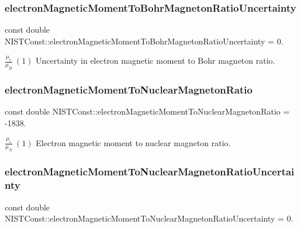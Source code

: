 \subsubsection{\texorpdfstring{electron\+Magnetic\+Moment\+To\+Bohr\+Magneton\+Ratio\+Uncertainty}{electronMagneticMomentToBohrMagnetonRatioUncertainty}}
{\footnotesize\ttfamily const double N\+I\+S\+T\+Const\+::electron\+Magnetic\+Moment\+To\+Bohr\+Magneton\+Ratio\+Uncertainty = 0.}

$\frac{\mu_e}{\mu_B} \ (1)$ Uncertainty in electron magnetic moment to Bohr magneton ratio. \mbox{\label{group___electron_ga2c0f984bb3ae4dd8ca2696d4fec8f9bf}} 
\subsubsection{\texorpdfstring{electron\+Magnetic\+Moment\+To\+Nuclear\+Magneton\+Ratio}{electronMagneticMomentToNuclearMagnetonRatio}}
{\footnotesize\ttfamily const double N\+I\+S\+T\+Const\+::electron\+Magnetic\+Moment\+To\+Nuclear\+Magneton\+Ratio = -\/1838.}

$\frac{\mu_e}{\mu_N} \ (1)$ Electron magnetic moment to nuclear magneton ratio. \mbox{\label{group___electron_gaef21c4a5c3acb2839194d7ad221ab91c}} 
\subsubsection{\texorpdfstring{electron\+Magnetic\+Moment\+To\+Nuclear\+Magneton\+Ratio\+Uncertainty}{electronMagneticMomentToNuclearMagnetonRatioUncertainty}}
{\footnotesize\ttfamily const double N\+I\+S\+T\+Const\+::electron\+Magnetic\+Moment\+To\+Nuclear\+Magneton\+Ratio\+Uncertainty = 0.}

